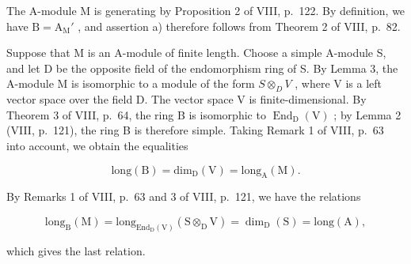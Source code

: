 The A-module M is generating by Proposition 2 of VIII, p.~122. By definition, we have \(\mathrm{B} = \mathrm{A}_{\mathrm{M}}'\) , and assertion a) therefore follows from Theorem 2 of VIII, p.~82.

Suppose that M is an A-module of finite length. Choose a simple A-module S, and let D be the opposite field of the endomorphism ring of S. By Lemma 3, the A-module M is isomorphic to a module of the form \(S \otimes_{D} V\) , where V is a left vector space over the field D. The vector space V is finite-dimensional. By Theorem 3 of VIII, p.~64, the ring B is isomorphic to \(\operatorname{End}_{\mathrm{D}}(\mathrm{V})\) ; by Lemma 2 (VIII, p.~121), the ring B is therefore simple. Taking Remark 1 of VIII, p.~63 into account, we obtain the equalities

\[
\mathrm{long(B)} = \mathrm {dim_ {D} (V)} = \mathrm {long_ {A} (M)}.
\]

By Remarks 1 of VIII, p.~63 and 3 of VIII, p.~121, we have the relations

\[
\mathrm{long} _ {\mathrm{B}} (\mathrm{M}) = \mathrm{long} _ {\mathrm{End} _ {\mathrm{D}} (\mathrm{V})} (\mathrm{S} \otimes_ {\mathrm{D}} \mathrm{V}) = \dim_ {\mathrm{D}} (\mathrm{S}) = \mathrm{long} (\mathrm{A}),
\]

which gives the last relation.

